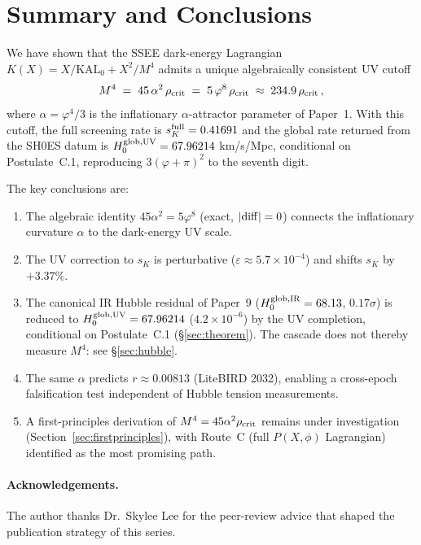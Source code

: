\documentclass[12pt,a4paper]{article}
\newcommand{\phiG}{\varphi}
\newcommand{\KAL}{\mathrm{KAL}_0}
\newcommand{\sK}{s_K}
\newcommand{\rhoc}{\rho_{\rm crit}}
\begin{document}
\section{Summary and Conclusions}

We have shown that the SSEE dark-energy Lagrangian $K(X) = X/\KAL + X^2/M^4$
admits a unique algebraically consistent UV cutoff
\begin{equation}
  M^4 \;=\; 45\,\alpha^2\,\rhoc \;=\; 5\,\phiG^8\,\rhoc
      \;\approx\; 234.9\,\rhoc\,,
\end{equation}
where $\alpha = \phiG^4/3$ is the inflationary $\alpha$-attractor parameter of
Paper~1.
With this cutoff, the full screening rate is
$\sK^{\rm full} = 0.41691$ and the global rate returned from the SH0ES datum is
$H_0^{\rm glob,UV} = 67.96214$ km/s/Mpc, conditional on
Postulate~C.1, reproducing $3(\phiG+\pi)^2$ to the seventh digit.

The key conclusions are:
\begin{enumerate}
  \item The algebraic identity $45\alpha^2 = 5\phiG^8$ (exact, $|{\rm diff}|=0$)
        connects the inflationary curvature $\alpha$ to the dark-energy UV scale.
  \item The UV correction to $\sK$ is perturbative
        ($\varepsilon \approx 5.7\times10^{-4}$) and shifts $\sK$ by $+3.37\%$.
  \item The canonical IR Hubble residual of Paper~9
        ($H_0^{\rm glob,IR}=68.13$, $0.17\sigma$) is reduced to
        $H_0^{\rm glob,UV}=67.96214$ ($4.2\times10^{-6}$) by the UV
        completion, conditional on Postulate~C.1 (§\ref{sec:theorem}).
        The cascade does not thereby measure $M^4$: see
        §\ref{sec:hubble}.
  \item The same $\alpha$ predicts $r \approx 0.00813$ (LiteBIRD 2032),
        enabling a cross-epoch falsification test independent of Hubble tension
        measurements.
  \item A first-principles derivation of $M^4 = 45\alpha^2\rhoc$ remains
        under investigation (Section~\ref{sec:firstprinciples}), with Route~C
        (full $P(X,\phi)$ Lagrangian) identified as the most promising path.
\end{enumerate}

\paragraph{Acknowledgements.}
The author thanks Dr.\ Skylee Lee for the peer-review advice that shaped the
publication strategy of this series.
\end{document}
